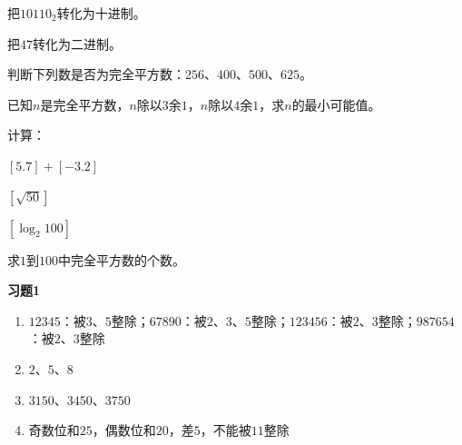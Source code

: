 \documentclass[a4paper,12pt]{ctexart}
\begin{document}
\newpage









\begin{exercise}
\item 把$10110_2$转化为十进制。
\item 把$47$转化为二进制。
\item 判断下列数是否为完全平方数：$256$、$400$、$500$、$625$。
\item 已知$n$是完全平方数，$n$除以$3$余$1$，$n$除以$4$余$1$，求$n$的最小可能值。
\item 计算：
  \begin{subexercise}
    \item $[5.7]+[-3.2]$
    \item $[\sqrt{50}]$
    \item $[\log_2 100]$
  \end{subexercise}
\item 求$1$到$100$中完全平方数的个数。
\end{exercise}

\newpage
{}

\textbf{习题1}
\begin{enumerate}
\item $12345$：被$3$、$5$整除；$67890$：被$2$、$3$、$5$整除；$123456$：被$2$、$3$整除；$987654$：被$2$、$3$整除
\item $2$、$5$、$8$
\item $3150$、$3450$、$3750$
\item 奇数位和$25$，偶数位和$20$，差$5$，不能被$11$整除
\end{enumerate}
\end{document}
